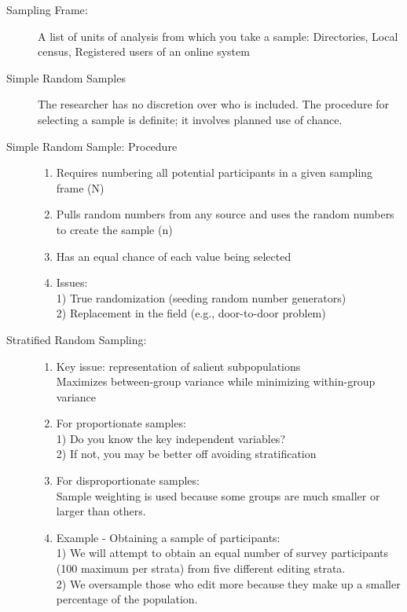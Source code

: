 \documentclass[10pt,landscape]{article}
\begin{document}
\begin{multicols}{3}
\begin{description}
\item[Sampling Frame:] A list of units of analysis from which you take a sample: Directories, Local census, Registered users of an online system\\
\item[Simple Random Samples] The researcher has no discretion over who is included. The procedure for selecting a sample is definite; it involves planned use of chance.
\item[Simple Random Sample: Procedure] \quad
\begin{enumerate}
  \item Requires numbering all potential participants in a given sampling frame (N)
  \item Pulls random numbers from any source and uses the random numbers to create the sample (n)
  \item Has an equal chance of each value being selected
  \item Issues:\\
  1) True randomization (seeding random number generators)\\
  2) Replacement in the field (e.g., door-to-door problem)\\
\end{enumerate}
\item[Stratified Random Sampling:] \quad
\begin{enumerate}
  \item Key issue: representation of salient subpopulations\\
    Maximizes between-group variance while minimizing within-group variance
  \item For proportionate samples:\\
  1) Do you know the key independent variables?\\
  2) If not, you may be better off avoiding stratification\\
  \item For disproportionate samples:\\
    Sample weighting is used because some groups are much smaller or larger than others.\\
  \item Example - Obtaining a sample of participants: \\
  1) We will attempt to obtain an equal number of survey participants (100 maximum per strata) from five different editing strata.\\
  2) We oversample those who edit more because they make up a smaller percentage of the population.\\

\end{enumerate}
\end{description}
\end{multicols}
\end{document}
